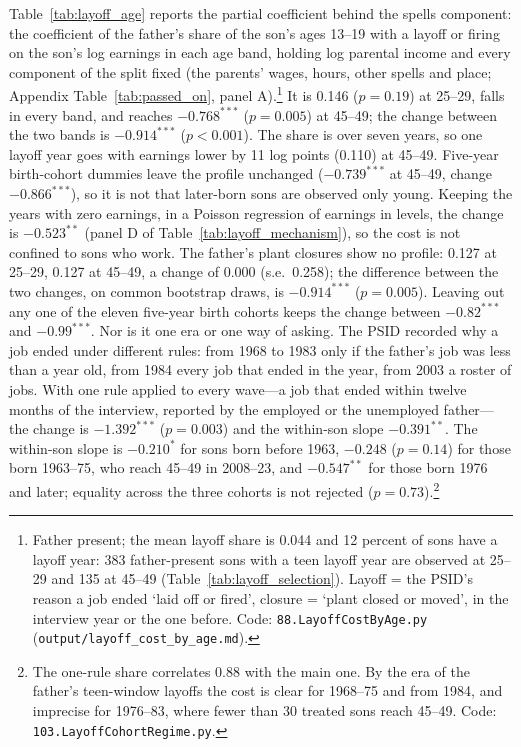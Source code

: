 
Table~\ref{tab:layoff_age} reports the partial coefficient behind the spells component: the coefficient of the
father's share of the son's ages 13--19 with a layoff or firing on the son's log earnings in each age band, holding log
parental income and every component of the split fixed (the parents' wages, hours, other spells and place; Appendix
Table~\ref{tab:passed_on}, panel A).\footnote{Father present; the mean layoff share is 0.044 and 12 percent of sons have
a layoff year: 383 father-present sons with a teen layoff year are observed at 25--29 and 135 at 45--49
(Table~\ref{tab:layoff_selection}). Layoff = the PSID's reason a job ended `laid off or fired', closure = `plant closed
or moved', in the interview year or the one before. Code: \texttt{88.LayoffCostByAge.py}
(\texttt{output/layoff\_cost\_by\_age.md}).} It is 0.146 ($p = 0.19$) at 25--29, falls in
every band, and reaches $-0.768^{***}$ ($p = 0.005$) at 45--49; the change between the two bands is $-0.914^{***}$
($p<0.001$). The share is over seven years, so one layoff year goes with earnings lower by 11 log points (0.110) at 45--49.
Five-year birth-cohort dummies leave the profile unchanged ($-0.739^{***}$ at 45--49, change $-0.866^{***}$), so it is
not that later-born sons are observed only young. Keeping the years with zero earnings, in a Poisson regression of
earnings in levels, the change is $-0.523^{**}$ (panel D of Table~\ref{tab:layoff_mechanism}), so the cost is not
confined to sons who work. The father's plant closures show no profile: 0.127 at 25--29, 0.127
at 45--49, a change of 0.000 (s.e.\ 0.258); the difference between the two changes, on common bootstrap draws, is
$-0.914^{***}$ ($p = 0.005$). Leaving out any one of the eleven five-year birth cohorts keeps the change between
$-0.82^{***}$ and $-0.99^{***}$. Nor is it one era or one way of asking. The PSID recorded why a job ended under
different rules: from 1968 to 1983 only if the father's job was less than a year old, from 1984 every job that ended
in the year, from 2003 a roster of jobs. With one rule applied to every wave---a job that ended within twelve months of
the interview, reported by the employed or the unemployed father---the change is $-1.392^{***}$ ($p = 0.003$) and the
within-son slope $-0.391^{**}$. The within-son slope is $-0.210^{*}$ for sons born before 1963, $-0.248$ ($p = 0.14$)
for those born 1963--75, who reach 45--49 in 2008--23, and $-0.547^{**}$ for those born 1976 and later; equality across
the three cohorts is not rejected ($p = 0.73$).\footnote{The one-rule share correlates 0.88 with the main one. By the
era of the father's teen-window layoffs the cost is clear for 1968--75 and from 1984, and imprecise for 1976--83, where
fewer than 30 treated sons reach 45--49. Code: \texttt{103.LayoffCohortRegime.py}.}

